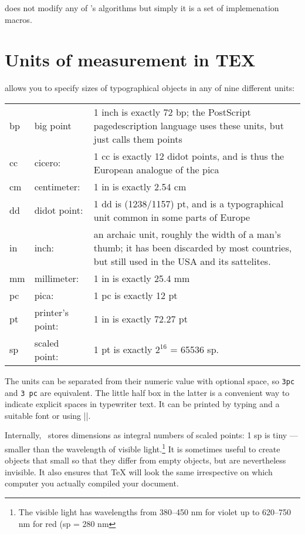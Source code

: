 \latex does not modify any of \tex's algorithms but simply it is a set of implemenation
macros.

\section{Units of measurement in TEX}

\tex allows you to specify sizes of typographical objects in any of nine different
units:


\begin{table}[htbp]
\begin{center}
\begin{tabular}{llp{5cm}}
\toprule
bp &big point &1 inch is exactly 72 bp; the PostScript pagedescription language uses these units, but just calls them points\\
cc &cicero: &1 cc is exactly 12 didot points, and is thus the European  analogue of the pica\\
cm &centimeter: &1 in is exactly 2.54 cm\\
dd &didot point: &1 dd is (1238/1157) pt, and is a typographical unit common in some parts of Europe\\
in &inch: &an archaic unit, roughly the width of a man's thumb; it has been discarded by most countries, but still used in the USA and its sattelites.\\
mm &millimeter: &1 in is exactly 25.4 mm\\
pc &pica: &1 pc is exactly 12 pt\\
pt &printer's point: &1 in is exactly 72.27 pt\\ 
sp &scaled point: &1 pt is exactly $2^{16}$ = 65536 sp.\\
\bottomrule
\end{tabular}
\end{center}
\end{table}



The units can be separated from their numeric value with optional space, so
\texttt{3pc} and \verb*+3 pc+ are equivalent. The little half box in the latter is a convenient
way to indicate explicit spaces in typewriter text. It can be printed by typing  and a suitable font or using |\textvisiblespace|.

Internally, \tex\ stores dimensions as integral numbers of scaled points:
1 sp is tiny ---  smaller than the wavelength of visible light.\footnote{The visible light has wavelengths from 380--450 nm for violet up to 620--750 nm for red (sp = 280 nm} It is sometimes
useful to create objects that small so that they differ from empty objects,
but are nevertheless invisible. It also ensures that TeX will look the same irrespective on which computer you actually compiled your document.

